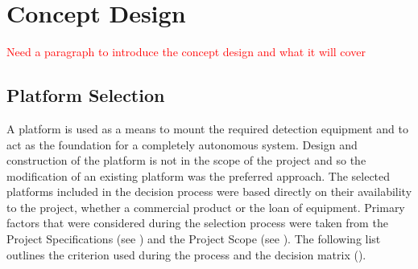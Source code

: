 \documentclass[main.tex]{subfiles}
\begin{document}
\chapter{Concept Design}
\textcolor{red}{Need a paragraph to introduce the concept design and what it will cover}


\section{Platform Selection}
A platform is used as a means to mount the required detection equipment and to act as the foundation for a completely autonomous system.  Design and construction of the platform is not in the scope of the project and so the modification of an existing platform was the preferred approach. The selected platforms included in the decision process were based directly on their availability to the project, whether a commercial product or the loan of equipment. Primary factors that were considered during the selection process were taken from the Project Specifications (see ) and the Project Scope (see ). The following list outlines the criterion used during the process and the decision matrix ().
\end{document}
